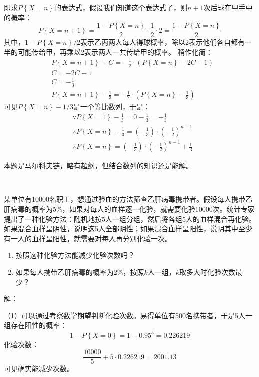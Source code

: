 即求$P\left\{ X=n \right\} $的表达式，假设我们知道这个表达式了，则$n+1$次后球在甲手中的概率：
\[
P\left\{ X=n+1 \right\} =\frac{1-P\left\{ X=n \right\}}{2}\cdot \frac{1}{2}\cdot 2=\frac{1-P\left\{ X=n \right\}}{2}
\]
其中，$1-P\left\{ X=n \right\} /2$表示乙丙两人每人得球概率，除以2表示他们各自都有一半的可能传给甲，再乘以2表示两人一共传给甲的概率。
稍作化简：
\begin{align*}
&P\left\{ X=n+1 \right\} +C=-\frac{1}{2}\cdot \left( P\left\{ X=n \right\} -2C-1 \right) \\
&C=-2C-1 \\
&C=-\frac{1}{3} \\
&P\left\{ X=n+1 \right\} -\frac{1}{3}=-\frac{1}{2}\cdot \left( P\left\{ X=n \right\} -\frac{1}{3} \right)
\end{align*}
可见$P\left\{ X=n \right\} -1/3$是一个等比数列，于是：
\begin{align*}
&\because P\left\{ X=1 \right\} -\frac{1}{3}=0-\frac{1}{3}=-\frac{1}{3} \\
&\therefore P\left\{ X=n \right\} -\frac{1}{3}=\left( -\frac{1}{3} \right) \cdot \left( -\frac{1}{2} \right) ^{n-1} \\
&\therefore P\left\{ X=n \right\} =\left( -\frac{1}{3} \right) \cdot \left( -\frac{1}{2} \right) ^{n-1}+\frac{1}{3}
\end{align*}

\begin{tcolorbox}
本题是马尔科夫链，略有超纲，但结合数列的知识还是能解。
\end{tcolorbox}

~

\begin{example}
某单位有10000名职工，想通过验血的方法筛查乙肝病毒携带者。假设每人携带乙肝病毒的概率为5\%，如果对每人的血样逐一化验，就需要化验10000次。统计专家提出了一种化验方法：随机地按5人一组分组，然后将各组5人的血样混合再化验。如果混合血样呈阴性，说明这5人全部阴性；如果混合血样呈阳性，说明其中至少有一人的血样呈阳性，就需要对每人再分别化验一次。
\begin{enumerate}
    \item 按照这种化验方法能减少化验次数吗？
    \item 如果每人携带乙肝病毒的概率为2\%，按照$k$人一组，$k$取多大时化验次数最少？
\end{enumerate}
\end{example}

解：

（1）可以通过考察数学期望判断化验次数。易得单位有500名携带者，于是5人一组存在阳性的概率：
\[
1-P\left\{ X=0 \right\} =1-0.95^5=0.226219
\]
化验次数：
\[
\frac{10000}{5}+5\cdot 0.226219=2001.13
\]
可见确实能减少次数。

